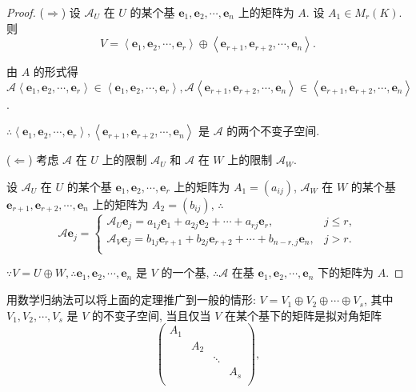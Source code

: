 \documentclass{ctexart}
\begin{document}
\begin{proof}
    ($\Rightarrow$) 设 $\mathcal{A}_U$ 在 $U$ 的某个基 $\boldsymbol{e}_1,\boldsymbol{e}_2,\cdots,\boldsymbol{e}_n$ 上的矩阵为 $A$. 设 $A_1\in M_r(K)$. 则
    \[V=\left<\boldsymbol{e}_1,\boldsymbol{e}_2,\cdots,\boldsymbol{e}_r\right>\oplus\left<\boldsymbol{e}_{r+1},\boldsymbol{e}_{r+2},\cdots,\boldsymbol{e}_n\right>.\]

    由 $A$ 的形式得 $\mathcal{A}\left<\boldsymbol{e}_1,\boldsymbol{e}_2,\cdots,\boldsymbol{e}_r\right>\in\left<\boldsymbol{e}_1,\boldsymbol{e}_2,\cdots,\boldsymbol{e}_r\right>,\mathcal{A}\left<\boldsymbol{e}_{r+1},\boldsymbol{e}_{r+2},\cdots,\boldsymbol{e}_n\right>\in\left<\boldsymbol{e}_{r+1},\boldsymbol{e}_{r+2},\cdots,\boldsymbol{e}_n\right>$.
    
    $\therefore\left<\boldsymbol{e}_1,\boldsymbol{e}_2,\cdots,\boldsymbol{e}_r\right>,\left<\boldsymbol{e}_{r+1},\boldsymbol{e}_{r+2},\cdots,\boldsymbol{e}_n\right>$ 是 $\mathcal{A}$ 的两个不变子空间.

    ($\Leftarrow$) 考虑 $\mathcal{A}$ 在 $U$ 上的限制 $\mathcal{A}_U$ 和 $\mathcal{A}$ 在 $W$ 上的限制 $\mathcal{A}_W$.

    设 $\mathcal{A}_U$ 在 $U$ 的某个基 $\boldsymbol{e}_1,\boldsymbol{e}_2,\cdots,\boldsymbol{e}_r$ 上的矩阵为 $A_1=(a_{ij})$, $\mathcal{A}_W$ 在 $W$ 的某个基 $\boldsymbol{e}_{r+1},\boldsymbol{e}_{r+2},\cdots,\boldsymbol{e}_n$ 上的矩阵为 $A_2=(b_{ij})$, $\therefore$
    \[\mathcal{A}\boldsymbol{e}_j=\begin{cases}
        \mathcal{A}_U\boldsymbol{e}_j=a_{1j}\boldsymbol{e}_1+a_{2j}\boldsymbol{e}_2+\cdots+a_{rj}\boldsymbol{e}_r, & j\leq r, \\
        \mathcal{A}_V\boldsymbol{e}_j=b_{1j}\boldsymbol{e}_{r+1}+b_{2j}\boldsymbol{e}_{r+2}+\cdots+b_{n-r,j}\boldsymbol{e}_n, & j>r. \\
    \end{cases}\]
    
    $\because V=U\oplus W,\therefore\boldsymbol{e}_1,\boldsymbol{e}_2,\cdots,\boldsymbol{e}_n$ 是 $V$ 的一个基, $\therefore\mathcal{A}$ 在基 $\boldsymbol{e}_1,\boldsymbol{e}_2,\cdots,\boldsymbol{e}_n$ 下的矩阵为 $A$.
\end{proof}
用数学归纳法可以将上面的定理推广到一般的情形: $V=V_1\oplus V_2\oplus\cdots\oplus V_s$, 其中 $V_1,V_2,\cdots,V_s$ 是 $V$ 的不变子空间, 当且仅当 $V$ 在某个基下的矩阵是拟对角矩阵
\[\begin{pmatrix}
    A_1 \\
    & A_2 \\
    && \ddots \\
    &&& A_s \\
\end{pmatrix},\]
\end{document}
